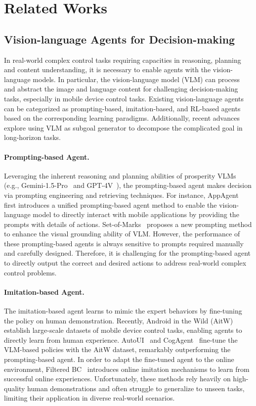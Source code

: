 \section{Related Works}
\label{sec:related_works}

\subsection{Vision-language Agents for Decision-making}
In real-world complex control tasks requiring capacities in reasoning, planning and content understanding, it is necessary to enable agents with the vision-language models.
In particular, the vision-language model (VLM) can process and abstract the image and language content for challenging decision-making tasks, especially in mobile device control tasks.
Existing vision-language agents can be categorized as prompting-based, imitation-based, and RL-based agents based on the corresponding learning paradigms.
Additionally, recent advances explore using VLM as subgoal generator to decompose the complicated goal in long-horizon tasks.

\paragraph{Prompting-based Agent.}
Leveraging the inherent reasoning and planning abilities of prosperity VLMs (e.g., Gemini-1.5-Pro~\cite{team2024gemini} and GPT-4V~\cite{openai2023gpt4v}), the prompting-based agent makes decision via prompting engineering and retrieving techniques.
For instance, AppAgent~\cite{yang2023appagent} first introduces a unified prompting-based agent method to enable the vision-language model to directly interact with mobile applications by providing the prompts with details of actions.
Set-of-Marks~\cite{yang2023set} proposes a new prompting method to enhance the visual grounding ability of VLM.
However, the performance of these prompting-based agents is always sensitive to prompts required manually and carefully designed.
Therefore, it is challenging for the prompting-based agent to directly output the correct and desired actions to address real-world complex control problems.

\paragraph{Imitation-based Agent.}
The imitation-based agent learns to mimic the expert behaviors by fine-tuning the policy on human demonstration.
Recently, Android in the Wild (AitW)~\cite{rawles2024androidinthewild} establish large-scale datasets of mobile device control tasks, enabling agents to directly learn from human experience.
AutoUI~\cite{zhang2023you} and CogAgent~\cite{hong2024cogagent} fine-tune the VLM-based policies with the AitW dataset, remarkably outperforming the prompting-based agent.
In order to adapt the fine-tuned agent to the online environment, Filtered BC~\cite{pan2024autonomous} introduces online imitation mechanisms to learn from successful online experiences. 
Unfortunately, these methods rely heavily on high-quality human demonstrations and often struggle to generalize to unseen tasks, limiting their application in diverse real-world scenarios.


